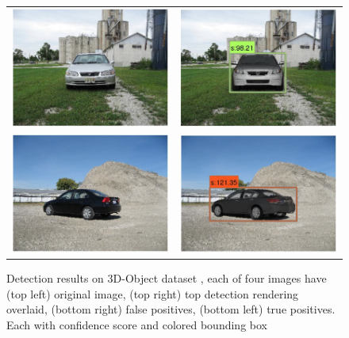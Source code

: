 \documentclass[10pt,twocolumn,letterpaper]{article}
\begin{document}
\begin{figure}[h]
    \begin{center}
    \setlength\tabcolsep{0pt}
\begin{tabular}{cc}
  \includegraphics[width=0.45\linewidth]{car_3dobject/7.png} &   
  \includegraphics[width=0.45\linewidth]{car_3dobject/8.png}\\ [-15pt]
  \includegraphics[width=0.45\linewidth]{car_3dobject/11.png} &   
  \includegraphics[width=0.45\linewidth]{car_3dobject/12.png}\\ [-5pt]
\end{tabular}
\end{center}
\caption{Detection results on 3D-Object dataset \cite{Savarese07}, each of four images have (top left) original image, (top right) top detection rendering overlaid, (bottom right) false positives, (bottom left) true positives. Each with confidence score and colored bounding box}
  \label{fig:3dobject}
\end{figure}
\end{document}
